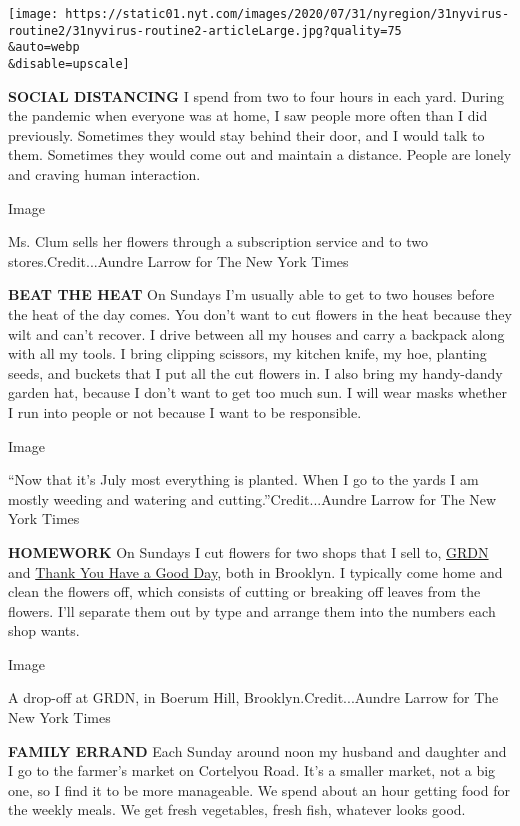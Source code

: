 \texttt{[image: https://static01.nyt.com/images/2020/07/31/nyregion/31nyvirus-routine2/31nyvirus-routine2-articleLarge.jpg?quality=75\\\&auto=webp\\\&disable=upscale]}

\textbf{SOCIAL DISTANCING} I spend from two to four hours in each yard.
During the pandemic when everyone was at home, I saw people more often
than I did previously. Sometimes they would stay behind their door, and
I would talk to them. Sometimes they would come out and maintain a
distance. People are lonely and craving human interaction.

Image

Ms. Clum sells her flowers through a subscription service and to two
stores.Credit...Aundre Larrow for The New York Times

\textbf{BEAT THE HEAT} On Sundays I'm usually able to get to two houses
before the heat of the day comes. You don't want to cut flowers in the
heat because they wilt and can't recover. I drive between all my houses
and carry a backpack along with all my tools. I bring clipping scissors,
my kitchen knife, my hoe, planting seeds, and buckets that I put all the
cut flowers in. I also bring my handy-dandy garden hat, because I don't
want to get too much sun. I will wear masks whether I run into people or
not because I want to be responsible.

Image

``Now that it's July most everything is planted. When I go to the yards
I am mostly weeding and watering and cutting.''Credit...Aundre Larrow
for The New York Times

\textbf{HOMEWORK} On Sundays I cut flowers for two shops that I sell to,
\href{https://grdnbklyn.com/}{GRDN} and
\href{https://www.thankyouhaveagoodday.com/}{Thank You Have a Good Day},
both in Brooklyn. I typically come home and clean the flowers off, which
consists of cutting or breaking off leaves from the flowers. I'll
separate them out by type and arrange them into the numbers each shop
wants.

Image

A drop-off at GRDN, in Boerum Hill, Brooklyn.Credit...Aundre Larrow for
The New York Times

\textbf{FAMILY ERRAND} Each Sunday around noon my husband and daughter
and I go to the farmer's market on Cortelyou Road. It's a smaller
market, not a big one, so I find it to be more manageable. We spend
about an hour getting food for the weekly meals. We get fresh
vegetables, fresh fish, whatever looks good.

